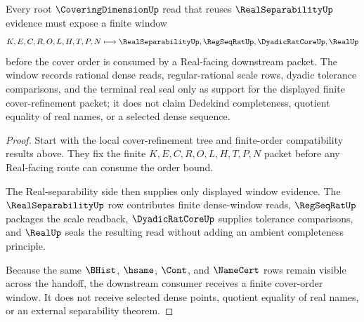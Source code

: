 \begin{theorem}
\label{thm:coveringdimension-root-real-separability-window}
Every root $\CoveringDimensionUp$ read that reuses $\RealSeparabilityUp$ evidence must expose a finite window
$$
K,E,C,R,O,L,H,T,P,N
\longmapsto
\RealSeparabilityUp,\RegSeqRatUp,\DyadicRatCoreUp,\RealUp
$$
before the cover order is consumed by a Real-facing downstream packet. The window records rational dense reads, regular-rational scale rows, dyadic tolerance comparisons, and the terminal real seal only as support for the displayed finite cover-refinement packet; it does not claim Dedekind completeness, quotient equality of real names, or a selected dense sequence.
\end{theorem}
\begin{proof}
Start with the local cover-refinement tree and finite-order compatibility results above. They fix the finite $K,E,C,R,O,L,H,T,P,N$ packet before any Real-facing route can consume the order bound.

The Real-separability side then supplies only displayed window evidence. The $\RealSeparabilityUp$ row contributes finite dense-window reads, $\RegSeqRatUp$ packages the scale readback, $\DyadicRatCoreUp$ supplies tolerance comparisons, and $\RealUp$ seals the resulting read without adding an ambient completeness principle.

Because the same $\BHist$, $\hsame$, $\Cont$, and $\NameCert$ rows remain visible across the handoff, the downstream consumer receives a finite cover-order window. It does not receive selected dense points, quotient equality of real names, or an external separability theorem.
\end{proof}
